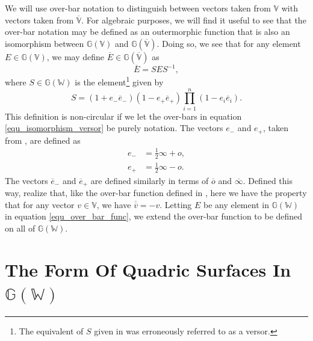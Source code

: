 \documentclass{birkjour}
\theoremstyle{definition}
\theoremstyle{remark}
\numberwithin{equation}{section}
\newcommand{\G}{\mathbb{G}}
\newcommand{\V}{\mathbb{V}}
\newcommand{\Vb}{\mathbb{\overline{V}}}
\newcommand{\W}{\mathbb{W}}
\newcommand{\nvao}{o}
\newcommand{\nvai}{\infty}
\newcommand{\nvaob}{\overline{o}}
\newcommand{\nvaib}{\overline{\infty}}
\newcommand{\eminus}{e_{-}}
\newcommand{\eplus}{e_{+}}
\newcommand{\eminusb}{\overline{e}_{-}}
\newcommand{\eplusb}{\overline{e}_{+}}
\begin{document}
We will use over-bar notation to distinguish between vectors taken from $\V$
with vectors taken from $\Vb$.  For algebraic purposes, we will find it useful
to see that the over-bar notation may be defined as an outermorphic function
that is also an isomorphism between $\G(\V)$ and $\G(\Vb)$.
Doing so, we see that for any element $E\in\G(\V)$,
we may define $\overline{E}\in\G(\Vb)$ as
\begin{equation}\label{equ_over_bar_func}
\overline{E} = SES^{-1},
\end{equation}
where $S\in\G(\W)$ is the element\footnote{The equivalent of $S$ given in \cite{Parkin12}
was erroneously referred to as a versor.} given by
\begin{equation}\label{equ_isomorphism_versor}
S = (1+\eminus\eminusb)(1-\eplus\eplusb)\prod_{i=1}^n(1-e_i\overline{e}_i).
\end{equation}
This definition is non-circular if we let the over-bars in equation \eqref{equ_isomorphism_versor}
be purely notation.  The vectors $\eminus$ and $\eplus$, taken from \cite{LiRockwood},
are defined as
\begin{align}
\eminus &= \frac{1}{2}\nvai + \nvao, \\
\eplus &= \frac{1}{2}\nvai - \nvao.
\end{align}
The vectors $\eminusb$ and $\eplusb$ are defined similarly in terms of $\nvaob$ and $\nvaib$.
Defined this way, realize that, like the over-bar function defined in \cite{Parkin12},
here we have the property that for any vector $v\in\V$, we have $\overline{\overline{v}}=-v$.
Letting $E$ be any element in $\G(\W)$ in equation \eqref{equ_over_bar_func},
we extend the over-bar function to be defined on all of $\G(\W)$.

\section{The Form Of Quadric Surfaces In $\G(\W)$}
\end{document}
